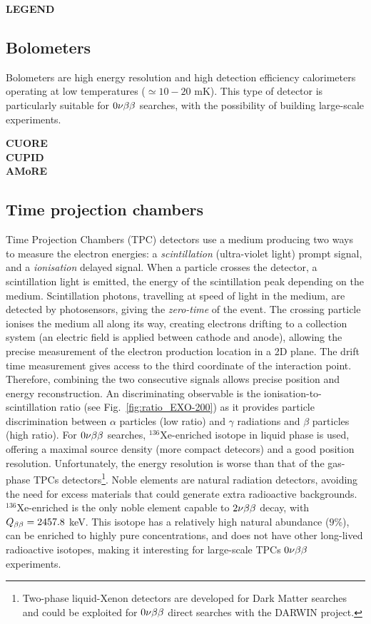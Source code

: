 \textbf{LEGEND}
\subsection{Bolometers}
\label{subsec:bolometers}

Bolometers are high energy resolution and high detection efficiency calorimeters operating at low temperatures ($\simeq 10-20$ mK).
This type of detector is particularly suitable for $0\nu\beta\beta$ searches, with the possibility of building large-scale experiments.

\textbf{CUORE}\\
\textbf{CUPID}\\
\textbf{AMoRE}
\subsection{Time projection chambers}
\label{subsec:TPC}

Time Projection Chambers (TPC) detectors use a medium producing two ways to measure the electron energies: a \emph{scintillation} (ultra-violet light) prompt signal, and a \emph{ionisation} delayed signal.
When a particle crosses the detector, a scintillation light is emitted, the energy of the scintillation peak depending on the medium.
Scintillation photons, travelling at speed of light in the medium, are detected by photosensors, giving the \emph{zero-time} of the event.
The crossing particle ionises the medium all along its way, creating electrons drifting to a collection system (an electric field is applied between cathode and anode), allowing the precise measurement of the electron production location in a 2D plane.
The drift time measurement gives access to the third coordinate of the interaction point.
Therefore, combining the two consecutive signals allows precise position and energy reconstruction.
An discriminating observable is the ionisation-to-scintillation ratio (see Fig.~\ref{fig:ratio_EXO-200}) as it provides particle discrimination between $\alpha$ particles (low ratio) and $\gamma$ radiations and $\beta$ particles (high ratio).
For $0\nu\beta\beta$ searches, $^{136}$Xe-enriched isotope in liquid phase is used, offering a maximal source density (more compact detecors) and a good position resolution.
Unfortunately, the energy resolution is worse than that of the gas-phase TPCs detectors\footnote{Two-phase liquid-Xenon detectors are developed for Dark Matter searches and could be exploited for $0\nu\beta\beta$ direct searches with the DARWIN project.}.
Noble elements are natural radiation detectors, avoiding the need for excess materials that could generate extra radioactive backgrounds.
$^{136}$Xe-enriched is the only noble element capable to $2\nu\beta\beta$ decay, with $Q_{\beta\beta}=2457.8$ keV.
This isotope has a relatively high natural abundance ($9$\%), can be enriched to highly pure concentrations, and does not have other long-lived radioactive isotopes, making it interesting for large-scale TPCs $0\nu\beta\beta$ experiments.\\

